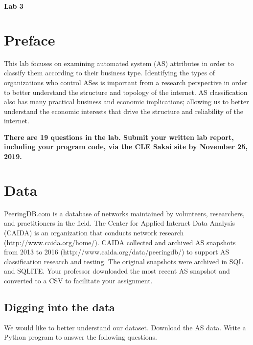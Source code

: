 \documentclass[11pt]{article}
\begin{document}
\vspace{10mm}

\setlength{\oddsidemargin}{.25in}
\setlength{\evensidemargin}{.25in}
\setlength{\textwidth}{6in}
\setlength{\topmargin}{-0.4in}
\setlength{\textheight}{8.5in}
\vspace*{10mm}
\centerline{\huge\bfseries Lab 3}

\section{Preface}

This lab focuses on examining automated system (AS) attributes in order to classify them according to their business type. Identifying the types of organizations who control ASes is important from a research perspective in order to better understand the structure and topology of the internet. AS classification also has many practical business and economic implications; allowing us to better understand the economic interests that drive the structure and reliability of the internet.
\vspace*{5mm}

\textbf{There are 19 questions in the lab. Submit your written lab report, including
your program code, via the CLE Sakai site by November 25, 2019.}

\section{Data}
PeeringDB.com is a database of networks maintained by volunteers, researchers, and practitioners in the field.  The Center for Applied Internet Data Analysis (CAIDA) is an organization that conducts network research (http://www.caida.org/home/).  CAIDA collected and archived AS snapshots from 2013 to 2016 (http://www.caida.org/data/peeringdb/) to support AS classification research and testing.  The original snapshots were archived in SQL and SQLITE.  Your professor downloaded the most recent AS snapshot and converted to a CSV to facilitate your assignment.

\subsection{ Digging into the data}
We would like to better understand our dataset.  Download the AS data.  Write a Python program to answer the following questions.
\end{document}

